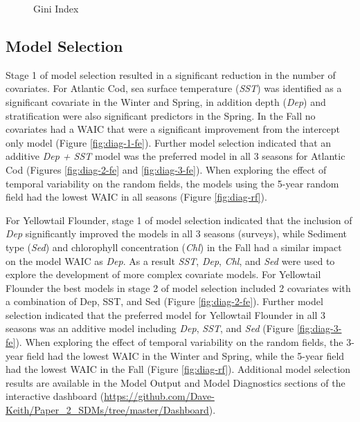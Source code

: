 \documentclass[
]{article}
\begin{document}
\begin{landscape}
\begin{landscape}
\begin{figure}[htb]
\caption{Gini Index }\label{fig:gini-index}
\end{figure}

\hypertarget{model-selection}{%
\subsection{Model Selection}\label{model-selection}}

Stage 1 of model selection resulted in a significant reduction in the number of covariates. For Atlantic Cod, sea surface temperature (\emph{SST}) was identified as a significant covariate in the Winter and Spring, in addition depth (\emph{Dep}) and stratification were also significant predictors in the Spring. In the Fall no covariates had a WAIC that were a significant improvement from the intercept only model (Figure \ref{fig:diag-1-fe}). Further model selection indicated that an additive \emph{Dep + SST} model was the preferred model in all 3 seasons for Atlantic Cod (Figures \ref{fig:diag-2-fe} and \ref{fig:diag-3-fe}). When exploring the effect of temporal variability on the random fields, the models using the 5-year random field had the lowest WAIC in all seasons (Figure \ref{fig:diag-rf}).

For Yellowtail Flounder, stage 1 of model selection indicated that the inclusion of \emph{Dep} significantly improved the models in all 3 seasons (surveys), while Sediment type (\emph{Sed}) and chlorophyll concentration (\emph{Chl}) in the Fall had a similar impact on the model WAIC as \emph{Dep}. As a result \emph{SST}, \emph{Dep}, \emph{Chl}, and \emph{Sed} were used to explore the development of more complex covariate models. For Yellowtail Flounder the best models in stage 2 of model selection included 2 covariates with a combination of Dep, SST, and Sed (Figure \ref{fig:diag-2-fe}). Further model selection indicated that the preferred model for Yellowtail Flounder in all 3 seasons was an additive model including \emph{Dep}, \emph{SST}, and \emph{Sed} (Figure \ref{fig:diag-3-fe}). When exploring the effect of temporal variability on the random fields, the 3-year field had the lowest WAIC in the Winter and Spring, while the 5-year field had the lowest WAIC in the Fall (Figure \ref{fig:diag-rf}). Additional model selection results are available in the Model Output and Model Diagnostics sections of the interactive dashboard (\url{https://github.com/Dave-Keith/Paper_2_SDMs/tree/master/Dashboard}).

\newpage
\begin{figure}[htb]


\end{figure}
\end{landscape}
\end{landscape}
\end{document}
